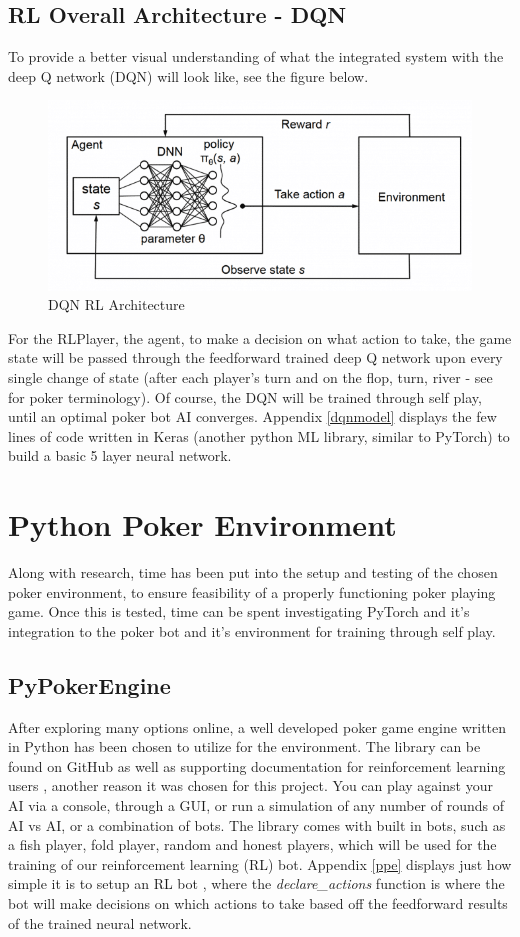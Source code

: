 \documentclass[12pt]{article}
\begin{document}
\subsection{RL Overall Architecture - DQN}
To provide a better visual understanding of what the integrated system with the deep Q network (DQN) will look like, see the figure below.
\begin{figure}[H]
    \centering
    \includegraphics[width=.80\linewidth]{figures/qsys}
    \caption{DQN RL Architecture \cite{qsys}}
    \label{fig:q}
\end{figure}
For the RLPlayer, the agent, to make a decision on what action to take, the game state will be passed through the feedforward trained deep Q network upon every single change of state (after each player's turn and on the flop, turn, river - see \cite{gloss} for poker terminology). Of course, the DQN will be trained through self play, until an optimal poker bot AI converges. Appendix \ref{dqnmodel} displays the few lines of code written in Keras (another python ML library, similar to PyTorch) to build a basic 5 layer neural network.

\section{Python Poker Environment}
Along with research, time has been put into the setup and testing of the chosen poker environment, to ensure feasibility of a properly functioning poker playing game. Once this is tested, time can be spent investigating PyTorch and it's integration to the poker bot and it's environment for training through self play.
\subsection{PyPokerEngine}
After exploring many options online, a well developed poker game engine written in Python has been chosen to utilize for the environment. The library can be found on GitHub \cite{pokergit} as well as supporting documentation for reinforcement learning users \cite{pokerdoc}, another reason it was chosen for this project. You can play against your AI via a console, through a GUI, or run a simulation of any number of rounds of AI vs AI, or a combination of bots. The library comes with built in bots, such as a fish player, fold player, random and honest players, which will be used for the training of our reinforcement learning (RL) bot. Appendix \ref{ppe} displays just how simple it is to setup an RL bot \cite{pokergit}, where the \textit{declare\_actions} function is where the bot will make decisions on which actions to take based off the feedforward results of the trained neural network.
\end{document}
